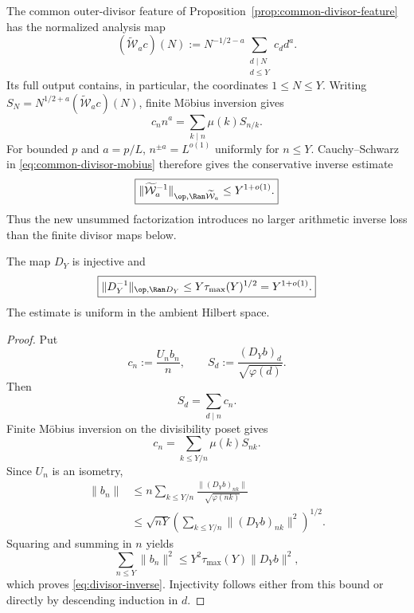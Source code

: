The common outer-divisor feature of
Proposition~\ref{prop:common-divisor-feature} has the normalized analysis map
\begin{equation}
(\widetilde{\mathcal W}_ac)(N)
:=N^{-1/2-a}\sum_{\substack{d\mid N\\d\le Y}}c_dd^a.
\label{eq:normalized-common-divisor-map}
\end{equation}
Its full output contains, in particular, the coordinates $1\le N\le Y$.
Writing $S_N=N^{1/2+a}(\widetilde{\mathcal W}_ac)(N)$, finite M\"obius
inversion gives
\begin{equation}
\boxed{c_nn^a=\sum_{k\mid n}\mu(k)S_{n/k}.}
\label{eq:common-divisor-mobius}
\end{equation}
For bounded $p$ and $a=p/L$, $n^{\pm a}=L^{o(1)}$ uniformly for $n\le Y$.
Cauchy--Schwarz in \eqref{eq:common-divisor-mobius} therefore gives the
conservative inverse estimate
\begin{equation}
\boxed{
\|\widetilde{\mathcal W}_a^{-1}\|_{\op,\Ran\widetilde{\mathcal W}_a}
\le Y^{1+o(1)}.
}
\label{eq:common-divisor-inverse}
\end{equation}
Thus the new unsummed factorization introduces no larger arithmetic inverse
loss than the finite divisor maps below.

\begin{proposition}
\label{prop:divisor-inverse}
The map $D_Y$ is injective and
\begin{equation}
\boxed{
\|D_Y^{-1}\|_{\op,\Ran D_Y}
\le Y\tau_{\max}(Y)^{1/2}=Y^{1+o(1)}.
}
\label{eq:divisor-inverse}
\end{equation}
The estimate is uniform in the ambient Hilbert space.
\end{proposition}

\begin{proof}
Put
\[
c_n:=\frac{U_nb_n}{n},
\qquad
S_d:=\frac{(D_Yb)_d}{\sqrt{\varphi(d)}}.
\]
Then
\[
S_d=\sum_{d\mid n}c_n.
\]
Finite M\"obius inversion on the divisibility poset gives
\begin{equation}
\boxed{
c_n=\sum_{k\le Y/n}\mu(k)S_{nk}.}
\label{eq:mobius-inverse}
\end{equation}
Since $U_n$ is an isometry,
\begin{align*}
\|b_n\|
&\le n\sum_{k\le Y/n}
\frac{\|(D_Yb)_{nk}\|}{\sqrt{\varphi(nk)}}\\
&\le \sqrt{nY}
\left(\sum_{k\le Y/n}\|(D_Yb)_{nk}\|^2\right)^{1/2}.
\end{align*}
Squaring and summing in $n$ yields
\[
\sum_{n\le Y}\|b_n\|^2
\le Y^2\tau_{\max}(Y)\|D_Yb\|^2,
\]
which proves \eqref{eq:divisor-inverse}. Injectivity follows either from this
bound or directly by descending induction in $d$.
\end{proof}


